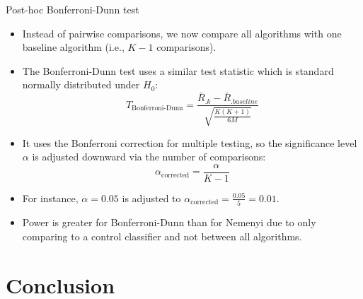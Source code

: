 \documentclass[11pt,compress,t,notes=noshow, xcolor=table]{beamer}
\begin{document}
\begin{frame}{Post-hoc Bonferroni-Dunn test}


    \begin{itemize}
    \setlength\itemsep{1em}
    \item Instead of pairwise comparisons, we now compare all algorithms with one baseline algorithm (i.e., $K-1$ comparisons).
    \item The Bonferroni-Dunn test uses a similar test statistic which is standard normally distributed under $H_0$:
    $$
        T_{\text{Bonferroni-Dunn}} = \frac{\bar{R}_{.k} - \bar{R}_{.baseline}}{\sqrt{\frac{K(K+1)}{6M}}}
    $$
     \item It uses the Bonferroni correction for multiple testing, so the significance level $\alpha$ is adjusted downward via the number of comparisons:
     $$
        \alpha_{\text{corrected}} = \frac{\alpha}{K - 1}
     $$
     \item For instance, $\alpha = 0.05$ is adjusted to $\alpha_{\text{corrected}} = \frac{0.05}{5} = 0.01$.
     \item Power is greater for Bonferroni-Dunn than for Nemenyi due to only comparing to a control classifier and not between all algorithms.
     \end{itemize}
\end{frame}

\section{Conclusion}
\end{document}

